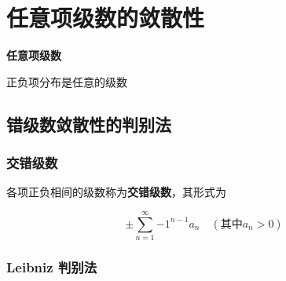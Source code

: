 \documentclass[lang = zh , final , oneside , openany , titlepage , zihao = -4 , linespread = 1.3 , baselineskip = false , cjk-font = windows , text-font = newtx , math-font = newtx]{sjtureport}
\begin{document}
\section{任意项级数的敛散性}

\textbf{任意项级数}

正负项分布是任意的级数

\subsection{错级数敛散性的判别法}

\subsubsection{交错级数}

\begin{definition}
    各项正负相间的级数称为\textbf{交错级数}，其形式为

\[\pm\sum_{n=1}^\infty {-1}^{n-1}a_n \quad \left(\text{其中}a_n > 0\right)\]
\end{definition}

\subsubsection{Leibniz 判别法}
\end{document}
